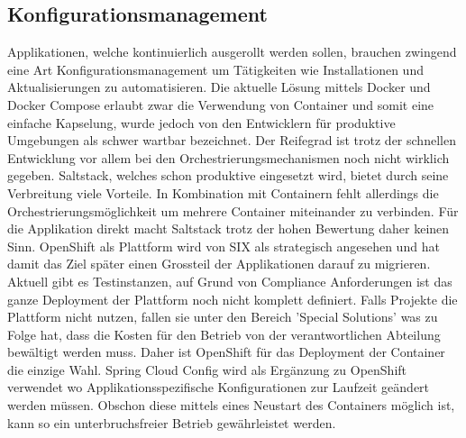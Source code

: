 \subsection{Konfigurationsmanagement}

Applikationen, welche kontinuierlich ausgerollt werden sollen, brauchen zwingend eine Art Konfigurationsmanagement um Tätigkeiten wie Installationen und Aktualisierungen zu automatisieren. Die aktuelle Lösung mittels Docker und Docker Compose erlaubt zwar die Verwendung von Container und somit eine einfache Kapselung, wurde jedoch von den Entwicklern für produktive Umgebungen als schwer wartbar bezeichnet. Der Reifegrad ist trotz der schnellen Entwicklung vor allem bei den Orchestrierungsmechanismen noch nicht wirklich gegeben.\newline
Saltstack, welches schon produktive eingesetzt wird, bietet durch seine Verbreitung viele Vorteile. In Kombination mit Containern fehlt allerdings die Orchestrierungsmöglichkeit um mehrere Container miteinander zu verbinden. Für die Applikation direkt macht Saltstack trotz der hohen Bewertung daher keinen Sinn.\newline
OpenShift als Plattform wird von SIX als strategisch angesehen und hat damit das Ziel später einen Grossteil der Applikationen darauf zu migrieren. Aktuell gibt es Testinstanzen, auf Grund von Compliance Anforderungen ist das ganze Deployment der Plattform noch nicht komplett definiert. Falls Projekte die Plattform nicht nutzen, fallen sie unter den Bereich 'Special Solutions' was zu Folge hat, dass die Kosten für den Betrieb von der verantwortlichen Abteilung bewältigt werden muss. Daher ist OpenShift für das Deployment der Container die einzige Wahl.
Spring Cloud Config wird als Ergänzung zu OpenShift verwendet wo Applikationsspezifische Konfigurationen zur Laufzeit geändert werden müssen. Obschon diese mittels eines Neustart des Containers möglich ist, kann so ein unterbruchsfreier Betrieb gewährleistet werden.

